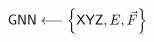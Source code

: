 \documentclass[preview]{standalone}
\begin{document}
\begin{center}
$\text{\sffamily GNN} \longleftarrow\left\{\text{\sffamily XYZ}, E, \vec{F}\right\}$
\end{center}
\end{document}
